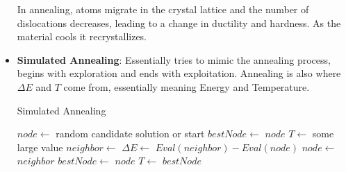 \documentclass[a4paper]{article}
\begin{document}
\begin{itemize}
    In annealing, atoms migrate in the crystal lattice and the number of dislocations decreases, leading to a change in ductility and hardness. As the material cools it recrystallizes.
    \item \textbf{Simulated Annealing}: Essentially tries to mimic the annealing process, begins with exploration and ends with exploitation. Annealing is also where $\Delta E$ and $T$ come from, essentially meaning Energy and Temperature.
    \begin{algorithm}[H]
        \caption{Simulated Annealing}\label{alg:simulated-annealing}
        \begin{algorithmic}[1]
            \Statex {}
            \State $node\gets$ random candidate solution or start
            \State $bestNode\gets$ $node$
            \State $T\gets$ some large value
                 
                    \State $neighbor\gets$ 
                    \State $\Delta E\gets$ $Eval(neighbor)-Eval(node)$
                        \State $node\gets$ $neighbor$
                            \State $bestNode\gets$ $node$
                        \EndIf
                    \EndIf
                \EndWhile
                \State $T\gets$ 
            \EndFor
            \State \Return $bestNode$
        \end{algorithmic}
    \end{algorithm}
\end{itemize}
\end{document}
